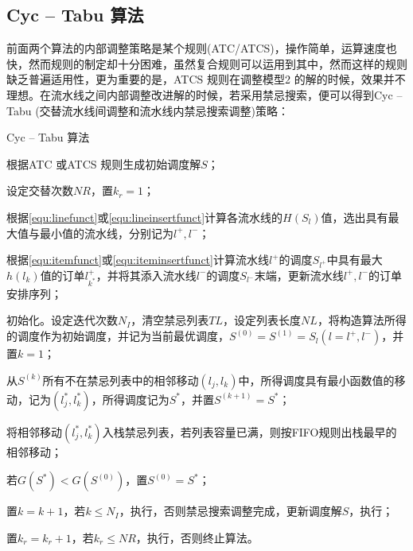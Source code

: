 \subsection{Cyc -- Tabu 算法}
前面两个算法的内部调整策略是某个规则(ATC/ATCS)，操作简单，运算速度也快，然而规则的制定却十分困难，虽然复合规则可以运用到其中，然而这样的规则缺乏普遍适用性，更为重要的是，ATCS 规则在调整模型2 的解的时候，效果并不理想。在流水线之间内部调整改进解的时候，若采用禁忌搜索，便可以得到Cyc -- Tabu (交替流水线间调整和流水线内禁忌搜索调整)策略：
\begin{algori}
Cyc -- Tabu 算法
\begin{asparaenum}
\renewcommand{\labelenumi}{\bf Step\theenumi~}
\item 根据ATC 或ATCS 规则生成初始调度解$S$；
\item 设定交替次数$NR$，置$k_r = 1$；
\item 根据\eqref{equ:linefunct}或\eqref{equ:lineinsertfunct}计算各流水线的$H(S_l)$值，选出具有最大值与最小值的流水线，分别记为$l^+, l^-$；
\item 根据\eqref{equ:itemfunct}或\eqref{equ:iteminsertfunct}计算流水线$l^+$的调度$S_{l^+}$中具有最大$h(l_k)$值的订单$l^+_{k^*}$，并将其添入流水线$l^-$的调度$S_{l^-}$末端，更新流水线$l^+, l^-$的订单安排序列；
\item 初始化。设定迭代次数$N_I$，清空禁忌列表$TL$，设定列表长度$NL$，将构造算法所得的调度作为初始调度，并记为当前最优调度，$S^{(0)} = S^{(1)} = S_l(l = l^+, l^-)$，并置$k = 1$；
\item 从$S^{(k)}$所有不在禁忌列表中的相邻移动$(l_j,l_k)$中，所得调度具有最小函数值的移动，记为$(l_j^*, l_k^*)$，所得调度记为$S^*$，并置$S^{(k+1)} = S^*$；
\item 将相邻移动$(l_j^*, l_k^*)$入栈禁忌列表，若列表容量已满，则按FIFO规则出栈最早的相邻移动；
\item 若$G(S^*) < G(S^{(0)})$，置$S^{(0)} = S^*$；
\item 置$k = k + 1$，若$k\le N_I$，执行，否则禁忌搜索调整完成，更新调度解$S$，执行；
\item 置$k_r = k_r + 1$，若$k_r\le NR$，执行，否则终止算法。
\end{asparaenum}
\end{algori}


